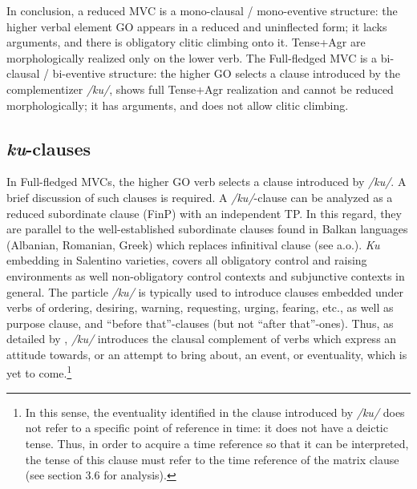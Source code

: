 \documentclass[output=paper]{langscibook}
\begin{document}
\ea \label{ac10}
    \z
\z

In conclusion, a reduced MVC is a mono-clausal / mono-eventive structure: the higher verbal element GO appears in a reduced and uninflected form; it lacks arguments, and there is obligatory clitic climbing onto it.   Tense+Agr are morphologically realized only on the lower verb.  The Full-fledged MVC is a bi-clausal / bi-eventive structure: the higher GO selects a clause introduced by the complementizer \textit{/ku/}, shows full Tense+Agr realization and cannot be reduced morphologically; it has arguments, and does not allow clitic climbing.

\subsection{\textit{ku}-clauses}

In Full-fledged MVCs, the higher GO verb selects a clause introduced by \textit{/ku/}.  A brief discussion of such clauses is required.  A \textit{/ku/}-clause can be analyzed as a reduced subordinate clause (FinP) with an independent TP.  In this regard, they are parallel to the well-established subordinate clauses found in Balkan languages (Albanian, Romanian, Greek) which replaces infinitival clause (see \citealt{calabrese1993a, rivero1994a, manzini2005a, roberts2003a} a.o.). \textit{Ku} embedding in Salentino varieties, covers all obligatory control and raising environments as well non-obligatory control contexts and subjunctive contexts in general. The particle \textit{/ku/} is typically used to introduce clauses embedded under verbs of ordering, desiring, warning, requesting, urging, fearing, etc., as well as purpose clause, and “before that”-clauses (but not “after that”-ones). Thus, as detailed by \citet{calabrese1993a}, \textit{/ku/} introduces the clausal complement of verbs which express an attitude towards, or an attempt to bring about, an event, or eventuality, which is yet to come.\footnote{In this sense, the eventuality identified in the clause introduced by \textit{/ku/} does not refer to a specific point of reference in time: it does not have a deictic tense.  Thus, in order to acquire a time reference so that it can be interpreted, the tense of this clause must refer to the time reference of the matrix clause (see section 3.6 for analysis).}
\end{document}
